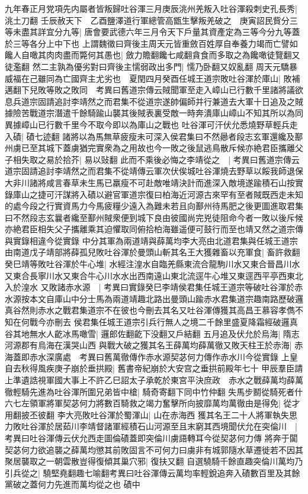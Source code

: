 九年春正月党項先内屬者皆叛歸吐谷渾三月庚辰洮州羌叛入吐谷渾殺刺史孔長秀|{
	洮土刀翻}
壬辰赦天下　乙酉鹽澤道行軍總管高甑生擊叛羌破之　庚寅詔民貲分三等未盡其詳宜分九等|{
	唐會要武德六年三月令天下戶量其資產定為三等今分九等蓋於三等各分上中下也}
上謂魏徵曰齊後主周天元皆重斂百姓厚自奉養力竭而亡譬如饞人自噉其肉肉盡而斃何其愚也|{
	斂力贍翻饞七咸翻貪食而多取之為饞噉徒覽翻又徒濫翻}
然二主孰為優劣對曰齊後主懦弱政出多門|{
	懦乃卧翻又奴亂翻}
周天元驕暴威福在己雖同為亡國齊主尤劣也　夏閏四月癸酉任城王道宗敗吐谷渾於庫山|{
	敗補邁翻下兒敗等敗之敗同　考異曰舊道宗傳云賊聞軍至走入嶂山已行數千里諸將議欲息兵道宗固請追討李靖然之而君集不從道宗遂帥偏師并行兼道去大軍十日追及之賊據險苦戰道宗潛遣千餘騎踰山襲其後賊表裏受敵一時奔潰庫山嶂山不知其所以為同異據嶂山已行數千里今不取今即以為庫山之戰也}
吐谷渾可汗伏允悉燒野草輕兵走入磧|{
	磧七迹翻}
諸將以為馬無草疲瘦未可深入侯君集曰不然曏者段志玄軍還纔及鄯州虜已至其城下蓋虜猶完實衆為之用故也今一敗之後鼠逃鳥散斥候亦絶君臣攜離父子相失取之易於拾芥|{
	易以䜴翻}
此而不乘後必悔之李靖從之　|{
	考異曰舊道宗傳云道宗固請追討李靖然之而君集不從靖傳云軍次伏俟城吐谷渾燒去野草以餒我師退保大非川諸將咸言春草未生馬已羸瘦不可赴敵唯靖決計而進深入敵境遂踰積石山按實錄庫山之捷可汗謀將入磧以避官軍道宗復曰柏海近河源古來罕有至者賊既西走未知的處今段之行實資馬力今馬疲糧少遠入為難未若且向鄯州待馬肥之後更圖進取君集曰不然段志玄曩者纔至鄯州賊衆便到城下良由彼國尚完兇徒阻命今者一敗以後斥候亦絶君臣相失父子攜離乘其迫懼取同俯拾柏海雖遥便可鼓行而至也靖又然之道宗傳與實錄相違今從實錄}
中分其軍為兩道靖與薛萬均李大亮由北道君集與任城王道宗由南道戊子靖部將薛孤兒敗吐谷渾於曼頭山斬其名王大獲雜畜以充軍食|{
	畜許救翻}
癸巳靖等敗吐谷渾於牛心堆|{
	水經注湟水自臨羌縣東流合龍駒川水又東合晉昌川水又東合長寧川水又東合牛心川水水出西南遠山東北流逕牛心堆又東逕西平亭西東北入於湟水}
又敗諸赤水源　|{
	考異曰實錄癸巳李靖侯君集任城王道宗等破吐谷渾於赤水源按本文自庫山中分士馬為兩道靖趣北路出曼頭山踰赤水君集道宗趣南路歷破邏真谷然則赤水之戰君集道宗不在彼也今刪去其名又吐谷渾傳獲其高昌王慕容孝儁不知在何戰今亦刪去}
侯君集任城王道宗引兵行無人之境二千餘里盛夏降霜經破邏真谷其地無水人齕冰馬噉雪|{
	邏郎佐翻齕下没翻又戶結翻}
五月追及伏允於烏海|{
	隋志河源郡有烏海在漢哭山西}
與戰大破之獲其名王薛萬均薛萬徹又敗天柱王於赤海|{
	赤海蓋即赤水深廣處　考異曰舊萬徹傳作赤水源契苾何力傳作赤水川今從實錄}
上皇自去秋得風疾庚子崩於垂拱殿|{
	舊書帝紀崩於大安宫之垂拱前殿年七十}
甲辰羣臣請上準遺誥視軍國大事上不許乙巳詔太子承乾於東宫平決庶政　赤水之戰薛萬均薛萬徹輕騎先進為吐谷渾所圍兄弟皆中槍|{
	騎奇寄翻下同中竹仲翻}
失馬步鬭從騎死者什六七左領軍將軍契苾何力將數百騎救之竭力奮擊所向披靡萬均萬徹由是得免|{
	從才用翻披丕彼翻}
李大亮敗吐谷渾於蜀渾山|{
	山在赤海西}
獲其名王二十人將軍執失思力敗吐谷渾於居茹川李靖督諸軍經積石山河源至且末窮其西境聞伏允在突倫川　|{
	考異曰吐谷渾傳云伏允西走圖倫磧蓋即突倫川虜語轉耳今從契苾何力傳}
將奔于闐契苾何力欲追襲之薛萬均懲其前敗固言不可何力曰虜非有城郭隨水草遷徙若不因其聚居襲取之一朝雲散豈得復傾其巢穴邪|{
	復扶又翻}
自選驍騎千餘直趣突倫川萬均乃引兵從之|{
	驍堅堯翻趣七喻翻考異曰吐谷渾傳云萬均率輕銳追奔入磧數百里及其餘黨破之蓋何力先進而萬均從之也}
磧中

